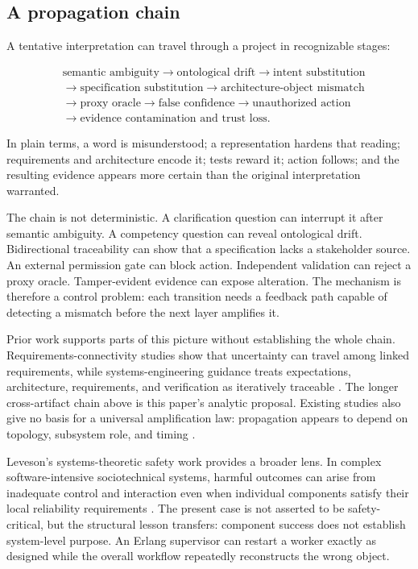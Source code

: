 \documentclass[10pt,a4paper]{article}
\begin{document}
\subsection{A propagation chain}

A tentative interpretation can travel through a project in recognizable stages:

\begin{equation}
\begin{split}
&\text{semantic ambiguity} \rightarrow \text{ontological drift}
\rightarrow \text{intent substitution} \\
&\rightarrow \text{specification substitution}
\rightarrow \text{architecture-object mismatch} \\
&\rightarrow \text{proxy oracle} \rightarrow \text{false confidence}
\rightarrow \text{unauthorized action} \\
&\rightarrow \text{evidence contamination and trust loss}.
\end{split}
\end{equation}

In plain terms, a word is misunderstood; a representation hardens that reading; requirements and architecture encode it; tests reward it; action follows; and the resulting evidence appears more certain than the original interpretation warranted.

The chain is not deterministic. A clarification question can interrupt it after semantic ambiguity. A competency question can reveal ontological drift. Bidirectional traceability can show that a specification lacks a stakeholder source. An external permission gate can block action. Independent validation can reject a proxy oracle. Tamper-evident evidence can expose alteration. The mechanism is therefore a control problem: each transition needs a feedback path capable of detecting a mismatch before the next layer amplifies it.

Prior work supports parts of this picture without establishing the whole chain. Requirements-connectivity studies show that uncertainty can travel among linked requirements, while systems-engineering guidance treats expectations, architecture, requirements, and verification as iteratively traceable \cite{salado2013,nasase2017}. The longer cross-artifact chain above is this paper's analytic proposal. Existing studies also give no basis for a universal amplification law: propagation appears to depend on topology, subsystem role, and timing \cite{salado2013,giffin2009}.

Leveson's systems-theoretic safety work provides a broader lens. In complex software-intensive sociotechnical systems, harmful outcomes can arise from inadequate control and interaction even when individual components satisfy their local reliability requirements \cite{leveson2012}. The present case is not asserted to be safety-critical, but the structural lesson transfers: component success does not establish system-level purpose. An Erlang supervisor can restart a worker exactly as designed while the overall workflow repeatedly reconstructs the wrong object.
\end{document}
